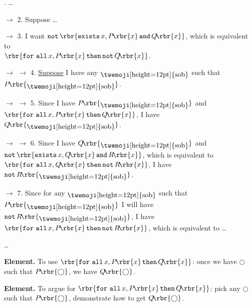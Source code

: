 \documentclass[oneside,12pt]{article}
\def\opthen{\mathop{\mathtt{then}}}
\def\opand{\mathop{\mathtt{and}}}
\def\opnot{\mathop{\mathtt{not}}}
\def\opforall{\mathop{\mathtt{for\ all}}}
\def\opexists{\mathop{\mathtt{exists}}}
\begin{document}
\begin{mdframed}
\small
{}. \ldots{}

\noindent $\longrightarrow$ 2. Suppose \ldots{}

\noindent $\longrightarrow$ 3. I want $ \opnot \rbr{ \opexists x, P\!\rbr{x} \opand Q\!\rbr{x} } $, which is equivalent to \\
$ \rbr{ \opforall x, P\!\rbr{x} \opthen \opnot Q\!\rbr{x} } $.

\noindent $\longrightarrow$ $\longrightarrow$ 4. \uline{Suppose} I have any $\raisebox{-3pt}{\twemoji[height=12pt]{sob}}$ such that $ P\!\rbr{\raisebox{-3pt}{\twemoji[height=12pt]{sob}}} $.

\noindent $\longrightarrow$ $\longrightarrow$ 5. Since I have $ P\!\rbr{\raisebox{-3pt}{\twemoji[height=12pt]{sob}}} $ and $ \rbr{ \opforall x, P\!\rbr{x} \opthen Q\!\rbr{x} } $, I have $ Q\!\rbr{\raisebox{-3pt}{\twemoji[height=12pt]{sob}}} $.

\noindent $\longrightarrow$ $\longrightarrow$ 6. Since I have $ Q\!\rbr{\raisebox{-3pt}{\twemoji[height=12pt]{sob}}} $ and $ \opnot \rbr{ \opexists x, Q\!\rbr{x} \opand R\!\rbr{x} } $, which is equivalent to$ \rbr{ \opforall x, Q\!\rbr{x} \opthen \opnot R\!\rbr{x} } $, I have $ \opnot R\!\rbr{\raisebox{-3pt}{\twemoji[height=12pt]{sob}}} $.

\noindent $\longrightarrow$ 7. Since for any $\raisebox{-3pt}{\twemoji[height=12pt]{sob}}$ such that $ P\!\rbr{\raisebox{-3pt}{\twemoji[height=12pt]{sob}}} $ I will have $ \opnot R\!\rbr{\raisebox{-3pt}{\twemoji[height=12pt]{sob}}} $, I have \\$ \rbr{ \opforall x, P\!\rbr{x} \opthen \opnot R\!\rbr{x} } $, which is equivalent to \ldots

\noindent\ldots{}

\end{mdframed}

\leavevmode

\hspace{-0.75in}\llap{$\Box$ } \textbf{Element.} To use $ \rbr{ \opforall x, P\!\rbr{x} \opthen Q\!\rbr{x} } $: once we have $\bigcirc$ such that $ P\!\rbr{\bigcirc} $, we have $ Q\!\rbr{\bigcirc} $.

\hspace{-0.75in}\llap{$\Box$ } \textbf{Element.} To argue for $ \rbr{ \opforall x, P\!\rbr{x} \opthen Q\!\rbr{x} } $: pick any $\bigcirc$ such that $ P\!\rbr{\bigcirc} $, demonstrate how to get $ Q\!\rbr{\bigcirc} $.
\end{document}
